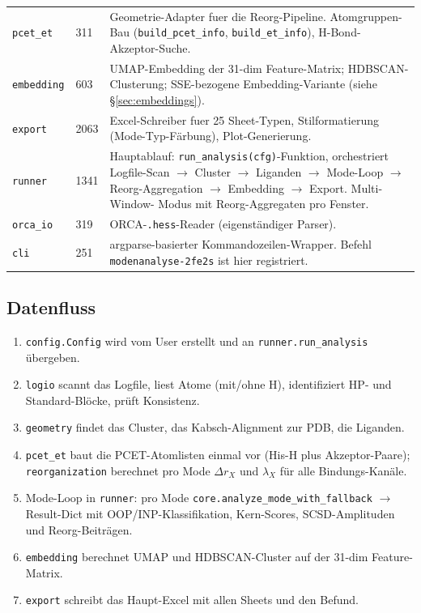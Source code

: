 \documentclass[11pt,a4paper,twoside]{article}
\theoremstyle{remark}
\begin{document}
\begin{longtable}{p{} p{} p{}}
\texttt{pcet\_et} & 311 & Geometrie-Adapter fuer die
  Reorg-Pipeline. Atomgruppen-Bau (\texttt{build\_pcet\_info},
  \texttt{build\_et\_info}), H-Bond-Akzeptor-Suche. \\

\texttt{embedding} & 603 & UMAP-Embedding der 31-dim
  Feature-Matrix; HDBSCAN-Clusterung; SSE-bezogene
  Embedding-Variante (siehe \S\ref{sec:embeddings}). \\

\texttt{export} & 2063 & Excel-Schreiber fuer 25 Sheet-Typen,
  Stilformatierung (Mode-Typ-F\"arbung), Plot-Generierung. \\

\texttt{runner} & 1341 & Hauptablauf:
  \texttt{run\_analysis(cfg)}-Funktion, orchestriert Logfile-Scan
  $\to$ Cluster $\to$ Liganden $\to$ Mode-Loop $\to$
  Reorg-Aggregation $\to$ Embedding $\to$ Export. Multi-Window-
  Modus mit Reorg-Aggregaten pro Fenster. \\

\texttt{orca\_io} & 319 & ORCA-\texttt{.hess}-Reader (eigenst\"andiger
  Parser). \\

\texttt{cli} & 251 & argparse-basierter Kommandozeilen-Wrapper.
  Befehl \texttt{modenanalyse-2fe2s} ist hier registriert. \\

\bottomrule
\end{longtable}

\subsection{Datenfluss}

\begin{enumerate}
  \item \texttt{config.Config} wird vom User erstellt und an
        \texttt{runner.run\_analysis} \"ubergeben.
  \item \texttt{logio} scannt das Logfile, liest Atome (mit/ohne H),
        identifiziert HP- und Standard-Bl\"ocke, pr\"uft
        Konsistenz.
  \item \texttt{geometry} findet das Cluster, das Kabsch-Alignment
        zur PDB, die Liganden.
  \item \texttt{pcet\_et} baut die PCET-Atomlisten einmal vor (His-H
        plus Akzeptor-Paare); \texttt{reorganization} berechnet pro
        Mode $\Delta r_X$ und $\lambda_X$ f\"ur alle Bindungs-Kan\"ale.
  \item Mode-Loop in \texttt{runner}: pro Mode
        \texttt{core.analyze\_mode\_with\_fallback} $\to$ Result-Dict
        mit OOP/INP-Klassifikation, Kern-Scores, SCSD-Amplituden und
        Reorg-Beitr\"agen.
  \item \texttt{embedding} berechnet UMAP und HDBSCAN-Cluster auf der
        31-dim Feature-Matrix.
  \item \texttt{export} schreibt das Haupt-Excel mit allen Sheets und
        den Befund.
\end{enumerate}
\end{document}
